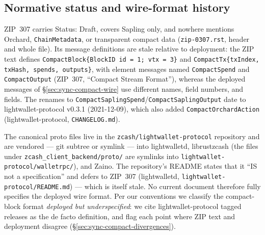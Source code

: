 \documentclass[11pt,a4paper]{article}
\theoremstyle{definition}
\begin{document}

\subsection{Normative status and wire-format history}%
\label{sec:sync-compact-status}

ZIP~307 carries Status: Draft, covers Sapling only, and nowhere mentions
Orchard, \texttt{ChainMetadata}, or transparent compact data
(\texttt{zip-0307.rst}, header and whole file). Its message definitions are
stale relative to deployment: the ZIP text defines
\texttt{CompactBlock\{BlockID id = 1; vtx = 3\}} and
\texttt{CompactTx\{txIndex, txHash, spends, outputs\}}, with element messages
named \texttt{CompactSpend} and \texttt{CompactOutput} (ZIP~307, ``Compact
Stream Format''), whereas the deployed messages of
\S\ref{sec:sync-compact-wire} use different names, field numbers, and fields.
The renames to \texttt{CompactSaplingSpend}/\texttt{CompactSaplingOutput}
date to \textsf{lightwallet-protocol} v0.3.1 (2021-12-09), which also added
\texttt{CompactOrchardAction} (\textsf{lightwallet-protocol},
\texttt{CHANGELOG.md}).

The canonical proto files live in the \texttt{zcash/lightwallet-protocol}
repository and are vendored --- git subtree or symlink --- into
\textsf{lightwalletd}, \textsf{librustzcash} (the files under
\texttt{zcash\_client\_backend/\allowbreak proto/} are symlinks into
\texttt{lightwallet-protocol/walletrpc/}), and \textsf{Zaino}. The
repository's README states that it ``IS not a specification'' and defers to
ZIP~307 (\textsf{lightwalletd},
\texttt{lightwallet-protocol/\allowbreak README.md}) --- which is itself
stale. No current document therefore fully specifies the deployed
wire format.
Per our conventions we classify the compact-block format \emph{deployed but
underspecified}: we cite \textsf{lightwallet-protocol} tagged releases as the
de facto definition, and flag each point where ZIP text and deployment
disagree (\S\ref{sec:sync-compact-divergences}).
\end{document}
